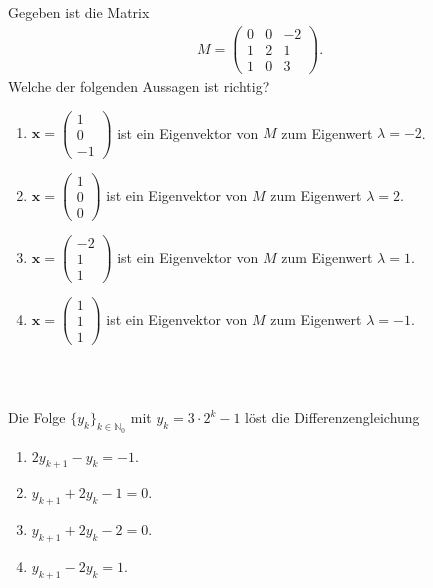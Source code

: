 \subsection*{}
Gegeben ist die Matrix
\begin{align*}
M
=
\begin{pmatrix}
0 & 0 & -2\\
1 & 2 & 1\\
1 & 0 & 3
\end{pmatrix}.
\end{align*}
Welche der folgenden Aussagen ist richtig?
\renewcommand{\labelenumi}{(\alph{enumi})}
\begin{enumerate}
\item 
$ \textbf{x} = \begin{pmatrix}
1 \\ 0 \\ -1
\end{pmatrix} $ ist ein Eigenvektor von $ M $ zum Eigenwert $ \lambda = -2 $.
\item
$ \textbf{x} = \begin{pmatrix}
1 \\ 0 \\ 0
\end{pmatrix} $ ist ein Eigenvektor von $ M $ zum Eigenwert $ \lambda = 2 $.
\item
$ \textbf{x} = \begin{pmatrix}
-2 \\ 1 \\ 1
\end{pmatrix} $ ist ein Eigenvektor von $ M $ zum Eigenwert $ \lambda = 1 $.
\item
$ \textbf{x} = \begin{pmatrix}
1 \\ 1 \\ 1
\end{pmatrix} $ ist ein Eigenvektor von $ M $ zum Eigenwert $ \lambda = -1 $.
\end{enumerate}
\ \\
\subsection*{}
Die Folge $ \{y_k\}_{k \in \mathbb{N}_0} $ mit $ y_k = 3 \cdot 2^k -1 $ löst die Differenzengleichung
\renewcommand{\labelenumi}{(\alph{enumi})}
\begin{enumerate}
	\item 
	$ 2 y_{k+1} - y_k = -1 $.
	\item
	$ y_{k+1} + 2 y_k  -1 = 0$.
	\item
	$ y_{k+1} + 2 y_k - 2 = 0 $.
	\item
	$ y_{k+1} - 2 y_k = 1$.
\end{enumerate}
\ \\
